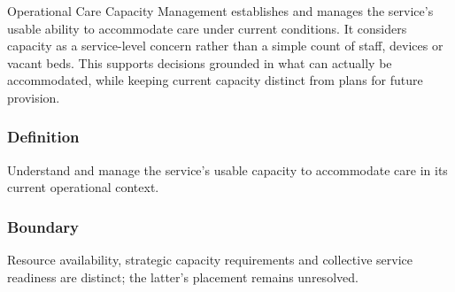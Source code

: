 Operational Care Capacity Management establishes and manages the service's usable ability to accommodate care under current conditions. It considers capacity as a service-level concern rather than a simple count of staff, devices or vacant beds. This supports decisions grounded in what can actually be accommodated, while keeping current capacity distinct from plans for future provision.

\subsubsection*{Definition}

Understand and manage the service’s usable capacity to accommodate care in its current operational context.

\subsubsection*{Boundary}

Resource availability, strategic capacity requirements and collective service readiness are distinct; the latter's placement remains unresolved.

